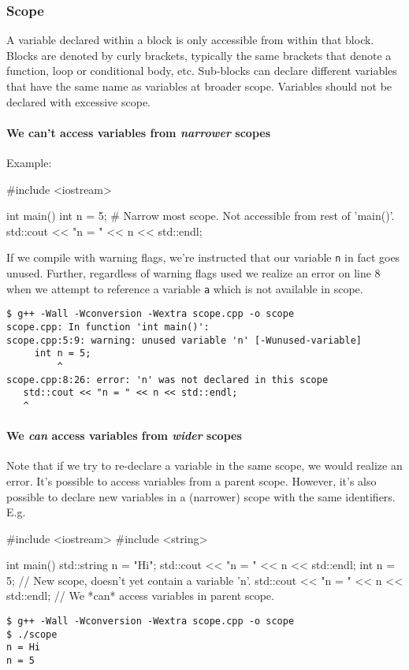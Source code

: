 \documentclass[12pt,letterpaper,twoside]{article}
\begin{document}
\subsubsection{Scope}
A variable declared within a block is only accessible from within that
block.
Blocks are denoted by curly brackets, typically the same brackets that
denote a function, loop or conditional body, etc.
Sub-blocks can declare different variables that have the same name as
variables at broader scope.
Variables should not be declared with excessive scope.

\paragraph{We can't access variables from \emph{narrower} scopes} Example:

\begin{cpp}
#include <iostream>

int main() {
  { int n = 5; }     # Narrow most scope. Not accessible from rest of 'main()'.
  std::cout << "n = " << n << std::endl;
}
\end{cpp}

If we compile with warning flags, we're instructed that our variable
\texttt{n} in fact goes unused. Further, regardless of warning flags
used we realize an error on line 8 when we attempt to reference a
variable \texttt{a} which is not available in scope.
{
  \footnotesize
\begin{verbatim}
$ g++ -Wall -Wconversion -Wextra scope.cpp -o scope
scope.cpp: In function 'int main()':
scope.cpp:5:9: warning: unused variable 'n' [-Wunused-variable]
     int n = 5;
         ^
scope.cpp:8:26: error: 'n' was not declared in this scope
   std::cout << "n = " << n << std::endl;
   ^
\end{verbatim}
}

\paragraph{We \emph{can} access variables from \emph{wider} scopes}
Note that if we try to re-declare a variable in the same scope, we
would realize an error. It's possible to access variables from a
parent scope. However, it's also possible to declare new variables in
a (narrower) scope with the same identifiers. E.g. 
\begin{cpp}
#include <iostream>
#include <string>

int main() {
  std::string n = "Hi";
  std::cout << "n = " << n << std::endl;
  {
    int n = 5;                                  // New scope, doesn't yet contain a variable 'n'.
    { std::cout << "n = " << n << std::endl; }  // We *can* access variables in parent scope.
  }
}
\end{cpp}
{\footnotesize
\begin{verbatim}
$ g++ -Wall -Wconversion -Wextra scope.cpp -o scope
$ ./scope
n = Hi
n = 5
\end{verbatim}
}
\end{document}
